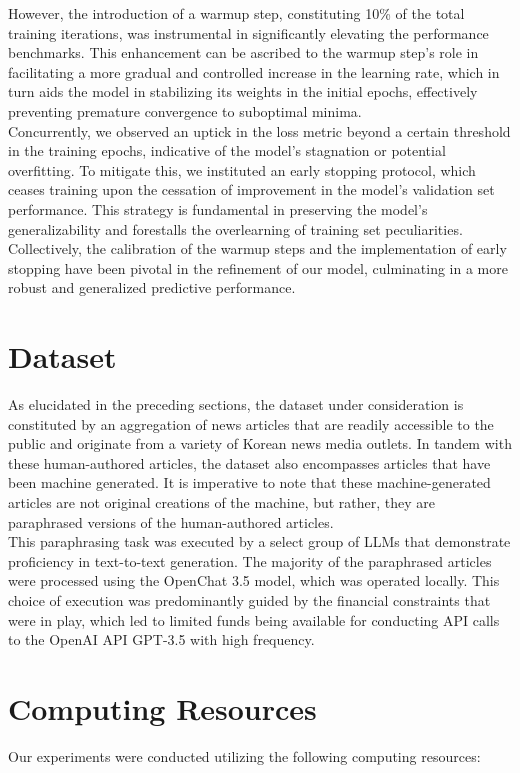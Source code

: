 \documentclass{article}
\begin{document}
However, the introduction of a warmup step, constituting 10\% of the total training iterations, was instrumental in significantly elevating the performance benchmarks.
This enhancement can be ascribed to the warmup step's role in facilitating a more gradual and controlled increase in the learning rate,
which in turn aids the model in stabilizing its weights in the initial epochs, effectively preventing premature convergence to suboptimal minima. \\
\null\quad Concurrently, we observed an uptick in the loss metric beyond a certain threshold in the training epochs, indicative of the model's stagnation or potential overfitting.
To mitigate this, we instituted an early stopping protocol, which ceases training upon the cessation of improvement in the model's validation set performance.
This strategy is fundamental in preserving the model's generalizability and forestalls the overlearning of training set peculiarities.
Collectively, the calibration of the warmup steps and the implementation of early stopping have been pivotal in the refinement of our model, culminating in a more robust and generalized predictive performance.

\section{Dataset}
\null\quad As elucidated in the preceding sections, the dataset under consideration is constituted by an aggregation of news articles that are readily accessible to the public and originate from a variety of Korean news media outlets.
In tandem with these human-authored articles, the dataset also encompasses articles that have been machine generated.
It is imperative to note that these machine-generated articles are not original creations of the machine, but rather, they are paraphrased versions of the human-authored articles. \\
\null\quad This paraphrasing task was executed by a select group of LLMs that demonstrate proficiency in text-to-text generation.
The majority of the paraphrased articles were processed using the OpenChat 3.5 model, which was operated locally.
This choice of execution was predominantly guided by the financial constraints that were in play, which led to limited funds being available for conducting API calls to the OpenAI API GPT-3.5 with high frequency.

\section{Computing Resources}
Our experiments were conducted utilizing the following computing resources:
\end{document}

